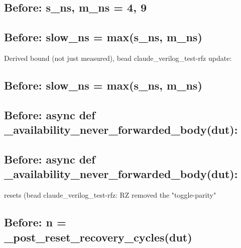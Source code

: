 \begin{record}
\subsection*{Before: s\_ns, m\_ns = 4, 9}


\subsection*{Before: slow\_ns = max(s\_ns, m\_ns)}

\begin{textblock}
Derived bound (not just measured), bead claude_verilog_test-rfz update:
\end{textblock}

\subsection*{Before: slow\_ns = max(s\_ns, m\_ns)}


\subsection*{Before: async def \_availability\_never\_forwarded\_body(dut):}


\subsection*{Before: async def \_availability\_never\_forwarded\_body(dut):}

\begin{textblock}
resets (bead claude_verilog_test-rfz: RZ removed the "toggle-parity"
\end{textblock}

\subsection*{Before: n = \_post\_reset\_recovery\_cycles(dut)}


\end{record}

